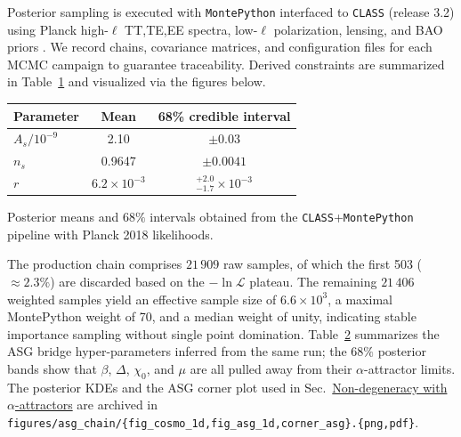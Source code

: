 \documentclass[
]{article}
\newcounter{none} %
\begin{document}
Posterior sampling is executed with \texttt{MontePython} interfaced to
\texttt{CLASS} (release 3.2) using Planck high-\(\ell\) TT,TE,EE
spectra, low-\(\ell\) polarization, lensing, and BAO priors . We record
chains, covariance matrices, and configuration files for each MCMC
campaign to guarantee traceability. Derived constraints are summarized
in Table~\hyperref[tab:constraints]{1} and visualized via the figures
below.

{\def\LTcaptype{none} %
\begin{longtable}[]{@{}lcc@{}}
\toprule\noalign{}
Parameter & Mean & 68\% credible interval \\
\midrule\noalign{}
\endhead
\bottomrule\noalign{}
\endlastfoot
\(A_{s}/10^{- 9}\) & 2.10 & \(\pm 0.03\) \\
\(n_{s}\) & 0.9647 & \(\pm 0.0041\) \\
\(r\) & \(6.2 \times 10^{- 3}\) &
\(_{- 1.7}^{+ 2.0} \times 10^{- 3}\) \\
\end{longtable}
}

Posterior means and \(68\%\) intervals obtained from the
\texttt{CLASS}+\texttt{MontePython} pipeline with Planck 2018
likelihoods.

The production chain comprises \(21\,909\) raw samples, of which the
first 503 (\(\approx 2.3\%\)) are discarded based on the
\(-\ln\mathcal{L}\) plateau. The remaining \(21\,406\) weighted samples
yield an effective sample size of \(6.6 \times 10^{3}\), a maximal
MontePython weight of 70, and a median weight of unity, indicating
stable importance sampling without single point domination.
Table~\hyperref[tab:asg-hyper]{2} summarizes the ASG bridge
hyper-parameters inferred from the same run; the \(68\%\) posterior
bands show that \(\beta\), \(\Delta\), \(\chi_{0}\), and \(\mu\) are all
pulled away from their \(\alpha\)-attractor limits. The posterior KDEs
and the ASG corner plot used in
Sec.~\hyperref[non-degeneracy-with-alpha-attractors]{Non-degeneracy with
\(\alpha\)-attractors} are archived in
\texttt{figures/asg\_chain/\{fig\_cosmo\_1d,fig\_asg\_1d,corner\_asg\}.\{png,pdf\}}.
\end{document}
